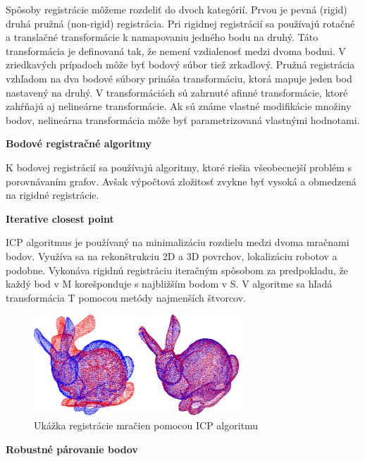 Spôsoby registrácie môžeme rozdeliť do dvoch kategórií. Prvou je pevná (rigid) druhá pružná (non-rigid) registrácia. Pri rigidnej registrácií sa používajú rotačné a translačné transformácie k namapovaniu jedného bodu na druhý. Táto transformácia je definovaná tak, že nemení vzdialenosť medzi dvoma bodmi. V zriedkavých prípadoch môže byť bodový súbor tiež zrkadlový. Pružná registrácia vzhľadom na dva bodové súbory prináša transformáciu, ktorá mapuje jeden bod nastavený na druhý. V transformáciách sú zahrnuté afinné transformácie, ktoré zahŕňajú aj nelineárne transformácie. Ak sú známe vlastné modifikácie množiny bodov, nelineárna transformácia môže byť parametrizovaná vlastnými hodnotami.\newline

\textbf{Bodové registračné algoritmy}

K bodovej registrácií sa používajú algoritmy, ktoré riešia všeobecnejší problém s porovnávaním grafov. Avšak výpočtová zložitosť zvykne byť vysoká a obmedzená na rigidné registrácie.\newline


\textbf{Iterative closest point}

ICP algoritmus je používaný na minimalizáciu rozdielu medzi dvoma mračnami bodov. Využíva sa na rekonštrukciu 2D a 3D povrchov, lokalizáciu robotov a podobne. Vykonáva rigidnú registráciu iteračným spôsobom za predpokladu, že každý bod v M korešponduje s najbližším bodom v S. V algoritme sa hľadá transformácia T pomocou metódy najmenších štvorcov.

\begin{figure}[h]

	\centering

	\includegraphics[width=0.7\textwidth]{figures/icp_principle.png} 

	\caption{Ukážka registrácie mračien pomocou ICP algoritmu}
	\label{fig:icp_principle}

\end{figure}
\newpage
\textbf{Robustné párovanie bodov}

